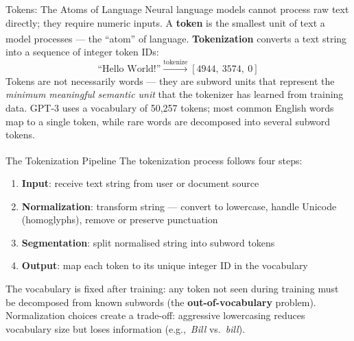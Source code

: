 \begin{v3topic}{Tokens: The Atoms of Language}
    Neural language models cannot process raw text directly; they require numeric inputs.
    A \textbf{token} is the smallest unit of text a model processes --- the ``atom'' of language\textsuperscript{\cite[][p.~15]{farrisHowLargeLanguage2025}}.
    \textbf{Tokenization} converts a text string into a sequence of integer token IDs:
    \[
        \text{``Hello World!''} \xrightarrow{\text{tokenize}} [4944,\ 3574,\ 0]
    \]
    Tokens are not necessarily words --- they are subword units that represent the \emph{minimum meaningful semantic unit} that the tokenizer has learned from training data.
    GPT-3 uses a vocabulary of 50{,}257 tokens; most common English words map to a single token, while rare words are decomposed into several subword tokens.

\end{v3topic}
\begin{v3topic}{The Tokenization Pipeline}
    The tokenization process follows four steps\textsuperscript{\cite[][p.~17]{farrisHowLargeLanguage2025}}:
    \begin{enumerate}
        \item \textbf{Input}: receive text string from user or document source
        \item \textbf{Normalization}: transform string --- convert to lowercase, handle Unicode (homoglyphs), remove or preserve punctuation
        \item \textbf{Segmentation}: split normalised string into subword tokens
        \item \textbf{Output}: map each token to its unique integer ID in the vocabulary
    \end{enumerate}
    The vocabulary is fixed after training: any token not seen during training must be decomposed from known subwords (the \textbf{out-of-vocabulary} problem).
    Normalization choices create a trade-off: aggressive lowercasing reduces vocabulary size but loses information (e.g.,\ \emph{Bill} vs.\ \emph{bill}).

\end{v3topic}

